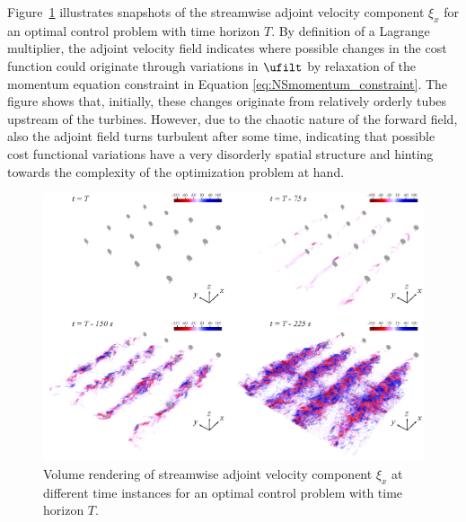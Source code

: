 	Figure~\ref{fig:adjoint_3D} illustrates snapshots of the streamwise adjoint velocity component $\xi_x$ for an optimal control problem with time horizon $T$. By definition of a Lagrange multiplier, the adjoint velocity field indicates where possible changes in the cost function could originate through variations in $\ufilt$ by relaxation of the momentum equation constraint in Equation \eqref{eq:NSmomentum_constraint}. The figure shows that, initially, these changes originate from relatively orderly tubes upstream of the turbines. However, due to the chaotic nature of the forward field, also the adjoint field turns turbulent after some time, indicating that possible cost functional variations have a very disorderly spatial structure and hinting towards the complexity of the optimization problem at hand.
	
	\begin{figure}
		\centering
		\includegraphics[width=\textwidth]{chapters/optimal_control_problem/adjoint_3D.eps}
		\caption{Volume rendering of streamwise adjoint velocity component $\xi_x$ at different time instances for an optimal control problem with time horizon $T$. \label{fig:adjoint_3D}}
	\end{figure}


